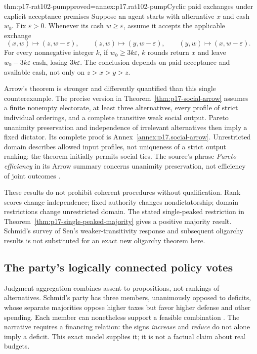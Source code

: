 \begin{hbtheorem}{thm:p17-rat102-pump}{proved=annex:p17.rat102-pump}{Cyclic paid exchanges under explicit acceptance premises}
Suppose an agent starts with alternative \(x\) and cash \(w_0\).
Fix \(\varepsilon>0\). Whenever its cash \(w\geq\varepsilon\), assume
it accepts the applicable exchange
\[
 (x,w)\mapsto(z,w-\varepsilon),\qquad
 (z,w)\mapsto(y,w-\varepsilon),\qquad
 (y,w)\mapsto(x,w-\varepsilon).
\]
For every nonnegative integer \(k\), if \(w_0\geq3k\varepsilon\),
\(k\) rounds return \(x\) and leave
\(w_0-3k\varepsilon\) cash, losing \(3k\varepsilon\).
The conclusion depends on paid acceptance and available cash, not only
on \(z>x>y>z\).
\end{hbtheorem}

Arrow's theorem is stronger and differently quantified than this single
counterexample. The precise version in Theorem~\ref{thm:p17-social-arrow}
assumes a finite nonempty electorate, at least three alternatives,
every profile of strict individual orderings, and a complete transitive
weak social output. Pareto unanimity preservation and independence of
irrelevant alternatives then imply a fixed dictator. Its complete proof
is Annex~\ref{annex:p17.social-arrow}. Unrestricted domain describes
allowed input profiles, not uniqueness of a strict output ranking; the
theorem initially permits social ties. The source's phrase \emph{Pareto
efficiency} in its Arrow summary concerns unanimity preservation, not
efficiency of joint outcomes
\parencite[p.~595]{Schmid2021CollectiveRationality}.

These results do not prohibit coherent procedures without qualification.
Rank scores change independence; fixed authority changes nondictatorship;
domain restrictions change unrestricted domain. The stated single-peaked
restriction in Theorem~\ref{thm:p17-single-peaked-majority} gives a positive
majority result. Schmid's survey of Sen's weaker-transitivity response and
subsequent oligarchy results is not substituted for an exact new oligarchy
theorem here.

\subsection{The party's logically connected policy votes}

Judgment aggregation combines assent to propositions, not rankings of
alternatives. Schmid's party has three members, unanimously opposed to
deficits, whose separate majorities oppose higher taxes but favor higher
defense and other spending. Each member can nonetheless support a feasible
combination \parencite[p.~596]{Schmid2021CollectiveRationality}.
The narrative requires a financing relation: the signs \emph{increase} and
\emph{reduce} do not alone imply a deficit. This exact model supplies it;
it is not a factual claim about real budgets.

